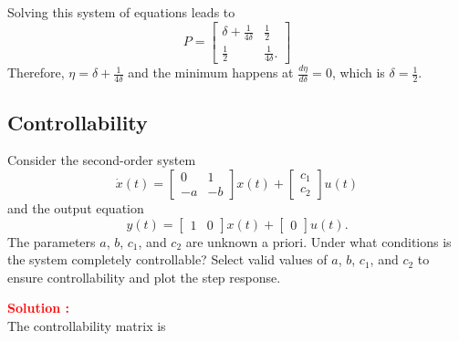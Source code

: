 \documentclass[12pt]{article}
\begin{document}
Solving this system of equations leads to
\begin{equation}
    P = \begin{bmatrix}
        \delta + \frac{1}{4\delta} & \frac{1}{2} \\ \frac{1}{2} & \frac{1}{4\delta}.


    \end{bmatrix}
\end{equation}
Therefore, \(\eta = \delta + \frac{1}{4\delta}\) and the minimum happens at \(\frac{d\eta}{d\delta} = 0\), which is \(\delta = \frac{1}{2}\).
\clearpage

\subsection{Controllability}

Consider the second-order system
\[
\dot{x}(t) = \begin{bmatrix} 0 & 1 \\ -a & -b \end{bmatrix} x(t) + \begin{bmatrix} c_1 \\ c_2 \end{bmatrix} u(t)
\]
and the output equation
\[
y(t) = \begin{bmatrix} 1 & 0 \end{bmatrix} x(t) + \begin{bmatrix} 0 \end{bmatrix} u(t).
\]
The parameters \(a\), \(b\), \(c_1\), and \(c_2\) are unknown a priori. Under what conditions is the system completely controllable? Select valid values of \(a\), \(b\), \(c_1\), and \(c_2\) to ensure controllability and plot the step response.


\textbf{\textcolor{red}{Solution :}} \\
The controllability matrix is 
\end{document}
